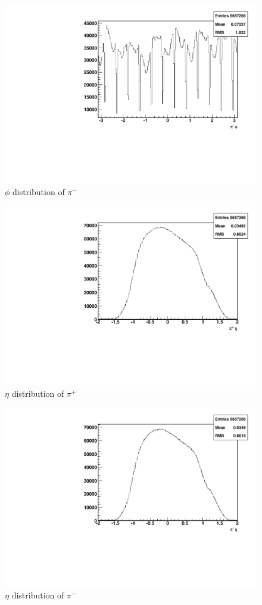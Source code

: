 \documentclass[abstract = on,listof=totoc, bibliography=totoc]{scrreprt}
\begin{document}
\begin{figure}
\begin{center}
\includegraphics[width = .8\textwidth]{hNegPhi}
\caption[$\phi$ distribution of $\pi^-$]{$\phi$ distribution of $\pi^-$}
\label{fig:negphi}
\end{center}
\end{figure}

\begin{figure}
\begin{center}
\includegraphics[width = .8\textwidth]{hPosEta}
\caption[$\eta$ distribution of $\pi^+$]{$\eta$ distribution of $\pi^+$}
\label{fig:poseta}
\end{center}
\end{figure}

\begin{figure}
\begin{center}
\includegraphics[width = .8\textwidth]{hNegEta}
\caption[$\eta$ distribution of $\pi^-$]{$\eta$ distribution of $\pi^-$}
\label{fig:negeta}
\end{center}
\end{figure}
\end{document}

